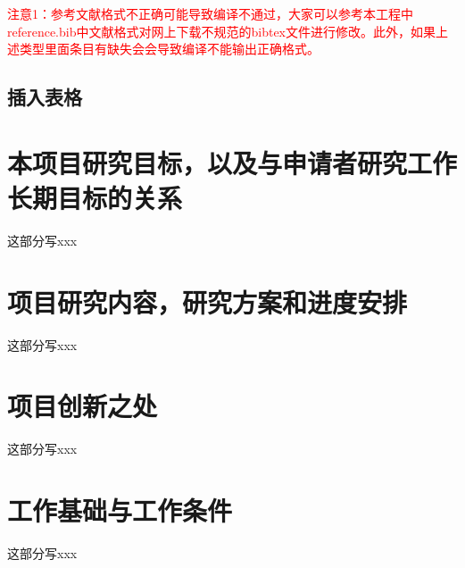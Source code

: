 \documentclass{wreport}
\begin{document}
\textcolor{red}{注意1：参考文献格式不正确可能导致编译不通过，大家可以参考本工程中reference.bib中文献格式对网上下载不规范的bibtex文件进行修改。此外，如果上述类型里面条目有缺失会会导致编译不能输出正确格式。}



\subsection{插入表格}

\begin{table}[h]
    \caption{工作进度安排}
  \centering
  \label{gra_process}
  \end{table}



\section{本项目研究目标，以及与申请者研究工作长期目标的关系}%
这部分写xxx




\section{项目研究内容，研究方案和进度安排}%
这部分写xxx



\section{项目创新之处}%
这部分写xxx



\section{工作基础与工作条件}%
这部分写xxx
\end{document}
